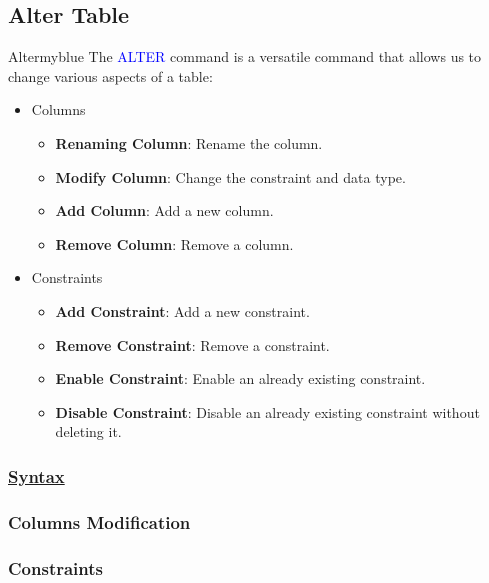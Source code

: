 \subsection{Alter Table}
\begin{prettyBox}{Alter}{myblue}
    The \textcolor{blue}{ALTER} command is a versatile command that allows us to change various aspects of a table:
\begin{itemize}
    \item Columns
        \begin{itemize}
            \item \textbf{Renaming Column}: Rename the column.
            \item \textbf{Modify Column}: Change the constraint and data type.
            \item \textbf{Add Column}: Add a new column.
            \item \textbf{Remove Column}: Remove a column.
        \end{itemize}
    \item Constraints
        \begin{itemize}
            \item \textbf{Add Constraint}: Add a new constraint. 
            \item \textbf{Remove Constraint}: Remove a constraint.
            \item \textbf{Enable Constraint}: Enable an already existing constraint.
            \item \textbf{Disable Constraint}: Disable an already existing constraint without deleting it.
        \end{itemize}
\end{itemize}
\end{prettyBox}

\subsubsection*{\underline{Syntax}}

\subsubsection*{Columns Modification}



\subsubsection*{Constraints}


